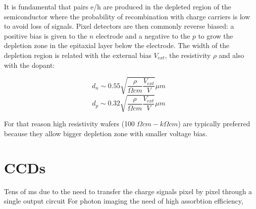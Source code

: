     It is fundamental that pairs e/h are produced in the depleted region of the semiconductor where the probability of recombination with charge carriers is low to avoid loss of signals. Pixel detectors are then commonly reverse biased: a positive bias is given to the $n$ electrode and a negative to the $p$ to grow the depletion zone in the epitaxial layer below the electrode. The width of the depletion region is related with the external bias $V_{ext}$, the resistivity $\rho$ and also with the dopant:
    \begin{multicols}{2}
        \begin{equation}
            d_{n} \sim 0.55 \sqrt{\frac{\rho}{\Omega cm}\frac{V_{ext}}{V}} \mu m 
        \end{equation}\break
        \begin{equation}
            d_{p} \sim 0.32 \sqrt{\frac{\rho}{\Omega cm}\frac{V_{ext}}{V}} \mu m
        \end{equation}
        \label{eq:deplation_d}
    \end{multicols}
    For that reason high resistivity wafers (100 $\Omega cm - k\Omega cm$) are typically preferred because they allow bigger depletion zone with smaller voltage bias. 

\section{CCDs}
Tens of \si{ms} due to the need to transfer the charge signals pixel by pixel through a single output circuit
For photon imaging the need of high assorbtion efficiency, 

